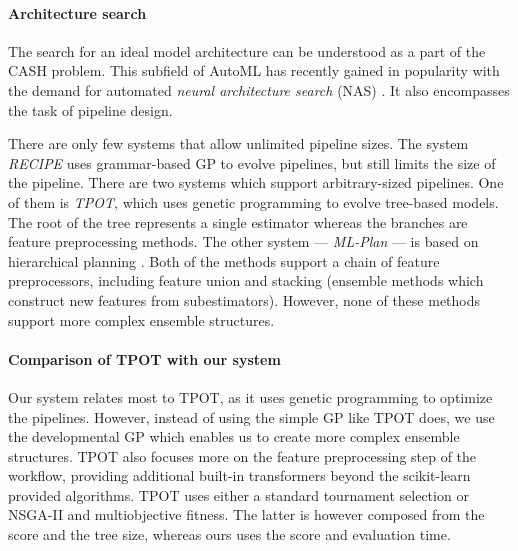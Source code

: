 \paragraph{Architecture search}
The search for an ideal model architecture can be understood as a part of the
CASH problem. This subfield of AutoML has recently gained in popularity with the
demand for automated \emph{neural architecture search} (NAS)
\cite{2018arXiv180805377E}. It also encompasses the task of pipeline design.

There are only few systems that allow unlimited pipeline sizes. The system
\emph{RECIPE} uses grammar-based GP to evolve pipelines, but still limits the
size of the pipeline. \citep{10.1007/978-3-319-55696-3_16}
There are two systems which support arbitrary-sized pipelines. One of them is
\emph{TPOT}, which uses genetic programming to evolve tree-based models. The
root of the tree represents a single estimator whereas the branches are feature
preprocessing methods. \citep{Olson2016EvoBio}
The other system --- \emph{ML-Plan} --- is based on hierarchical planning
\citep{Mohr2018}. Both of the methods support a chain of feature preprocessors,
including feature union and stacking (ensemble methods which construct new
features from subestimators). However, none of these methods support more
complex ensemble structures.
\paragraph{Comparison of TPOT with our system}
Our system relates most to TPOT, as it uses genetic programming to optimize
the pipelines. However, instead of using the simple GP like TPOT does, we use
the developmental GP which enables us to create more complex ensemble
structures. TPOT also focuses more on the feature preprocessing step of the 
workflow, providing additional built-in transformers beyond the scikit-learn 
provided algorithms. TPOT uses either a standard tournament selection or 
NSGA-II and multiobjective fitness. The latter is however composed from the 
score and the tree size, whereas ours uses the score and evaluation time.